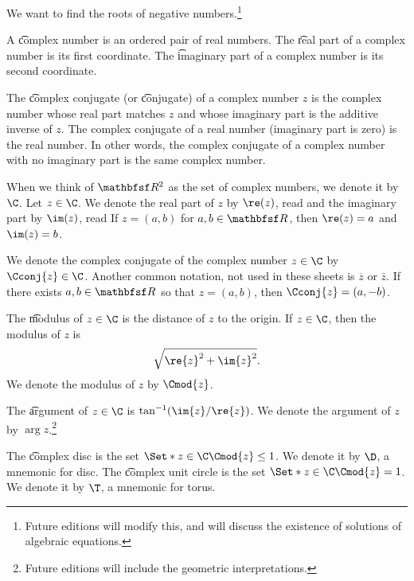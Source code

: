 

We want to find the roots of negative numbers.\footnote{Future editions will modify this, and will discuss the existence of solutions of algebraic equations.}


A \t{complex number} is an ordered pair of real numbers.
The \t{real part} of a complex number is its first coordinate.
The \t{imaginary part} of a complex number is its second coordinate.

The \t{complex conjugate} (or \t{conjugate}) of a complex number $z$ is the complex number whose real part matches $z$ and whose imaginary part is the additive inverse of $z$.
The complex conjugate of a real number (imaginary part is zero) is the real number.
In other words, the complex conjugate of a complex number with no imaginary part is the same complex number.


When we think of $\R^2$ as the set of complex numbers, we denote it by $\C$.
Let $z \in \C$.
We denote the real part of $z$ by $\re(z)$, read  and the imaginary part by $\im(z)$, read 
If $z = (a, b)$ for $a, b \in \R$, then $\re(z) = a$ and $\im(z) = b$.

We denote the complex conjugate of the complex number $z \in \C$ by $\Cconj{z} \in \C$.
Another common notation, not used in these sheets is $\overline{z}$ or $\bar{z}$.
If there exists $a, b \in \R$ so that $z = (a, b)$, then $\Cconj{z} = (a, -b)$.


The \t{modulus} of $z \in \C$ is the distance of $z$ to the origin.
If $z \in \C$, then the modulus of $z$ is
\[
  \sqrt{\re{z}^2 + \im{z}^2}.
\]
We denote the modulus of $z$ by $\Cmod{z}$.

The \t{argument} of $z \in \C$ is $\tan^{-1}(\im{z}/\re{z})$.
We denote the argument of $z$ by $\arg z$.\footnote{Future editions will include the geometric interpretations.}


The \t{complex disc} is the set $\Set*{z \in \C}{\Cmod{z} \leq 1}$.
We denote it by $\D$, a mnemonic for disc.
The \t{complex unit circle} is the set $\Set*{z \in \C}{\Cmod{z} = 1}$.
We denote it by $\T$, a mnemonic for torus.

\blankpage
